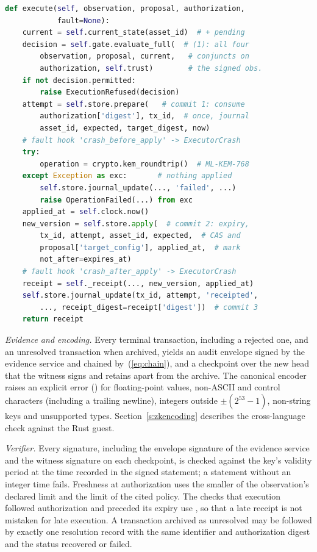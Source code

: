\begin{lstlisting}[float=tp,language=Python,basicstyle=\ttfamily\scriptsize,captionpos=b,caption={Execution path of the reference implementation, abridged from \texttt{abd/roles.py}. \texttt{asset\_id} and \texttt{tx\_id} come from the proposal; \texttt{expected}, \texttt{target\_digest} and \texttt{expires\_at} from the authorization; \texttt{now} from the clock.},label={lst:gate}]
def execute(self, observation, proposal, authorization,
            fault=None):
    current = self.current_state(asset_id)  # + pending
    decision = self.gate.evaluate_full(  # (1): all four
        observation, proposal, current,   # conjuncts on
        authorization, self.trust)        # the signed obs.
    if not decision.permitted:
        raise ExecutionRefused(decision)
    attempt = self.store.prepare(   # commit 1: consume
        authorization['digest'], tx_id,  # once, journal
        asset_id, expected, target_digest, now)
    # fault hook 'crash_before_apply' -> ExecutorCrash
    try:
        operation = crypto.kem_roundtrip()  # ML-KEM-768
    except Exception as exc:       # nothing applied
        self.store.journal_update(..., 'failed', ...)
        raise OperationFailed(...) from exc
    applied_at = self.clock.now()
    new_version = self.store.apply(  # commit 2: expiry,
        tx_id, attempt, asset_id, expected,  # CAS and
        proposal['target_config'], applied_at,  # mark
        not_after=expires_at)
    # fault hook 'crash_after_apply' -> ExecutorCrash
    receipt = self._receipt(..., new_version, applied_at)
    self.store.journal_update(tx_id, attempt, 'receipted',
        ..., receipt_digest=receipt['digest'])  # commit 3
    return receipt
\end{lstlisting}

\emph{Evidence and encoding.} Every terminal transaction, including a rejected one, and an unresolved transaction when archived, yields an audit envelope signed by the evidence service and chained by~(\ref{eq:chain}), and a checkpoint over the new head that the witness signs and retains apart from the archive. The canonical encoder raises an explicit error () for floating-point values, non-ASCII and control characters (including a trailing newline), integers outside $\pm(2^{53}-1)$, non-string keys and unsupported types. Section~\ref{s:zkencoding} describes the cross-language check against the Rust guest.

\emph{Verifier.} Every signature, including the envelope signature of the evidence service and the witness signature on each checkpoint, is checked against the key's validity period at the time recorded in the signed statement; a statement without an integer time fails. Freshness at authorization uses the smaller of the observation's declared limit and the limit of the cited policy. The checks that execution followed authorization and preceded its expiry use , so that a late receipt is not mistaken for late execution. A transaction archived as unresolved may be followed by exactly one resolution record with the same identifier and authorization digest and the status recovered or failed.

